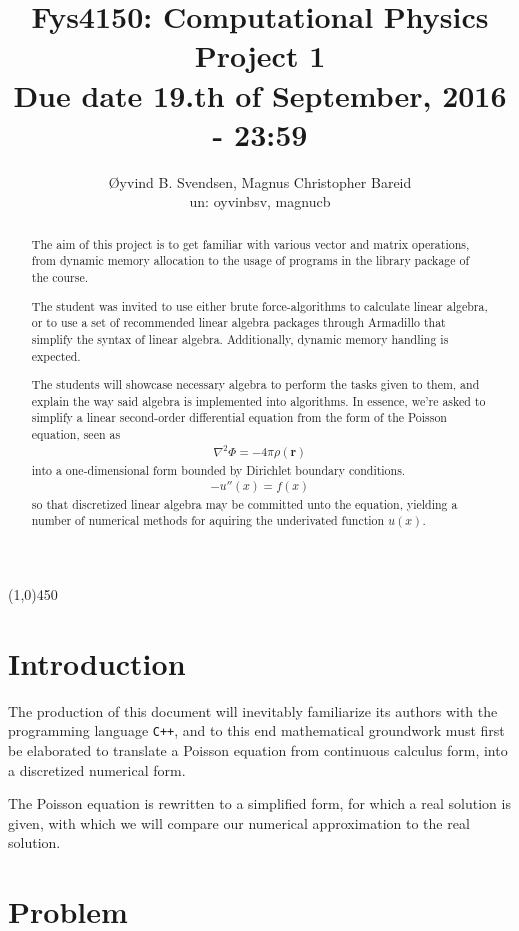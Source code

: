 \documentclass[11pt,a4paper,notitlepage]{article}
\title{\normalsize Fys4150: Computational Physics \\
\vspace{10mm}
\huge Project 1\\
\vspace{10mm}
\normalsize Due date {\bf 19.th of September, 2016 - 23:59}}
\author{Øyvind B. Svendsen, Magnus Christopher Bareid \\ un: oyvinbsv, magnucb}
\begin{document}
\noindent
\maketitle
\vspace{10mm}
\begin{abstract}
The aim of this project is to get familiar with various vector and matrix operations, from dynamic memory allocation to the usage of programs in the library package of the course.

The student was invited to use either brute force-algorithms to calculate linear algebra, or to use a set of recommended linear algebra packages through Armadillo that simplify the syntax of linear algebra. Additionally, dynamic memory handling is expected.

The students will showcase necessary algebra to perform the tasks given to them, and explain the way said algebra is implemented into algorithms. In essence, we're asked to simplify a linear second-order differential equation from the form of the Poisson equation, seen as
\begin{align*}
\nabla ^2 \Phi = -4\pi\rho(\mathbf{r})
\end{align*}
into a one-dimensional form bounded by Dirichlet boundary conditions.
\begin{align*}
-u''(x) = f(x)
\end{align*}
so that discretized linear algebra may be committed unto the equation, yielding a number of numerical methods for aquiring the underivated function $u(x)$.
\end{abstract}
\begin{center}
\line(1,0){450}
\end{center}

\tableofcontents

\newpage
\section{Introduction}
The production of this document will inevitably familiarize its authors with the programming language \verb|C++|, and to this end mathematical groundwork must first be elaborated to translate a Poisson equation from continuous calculus form, into a discretized numerical form.

The Poisson equation is rewritten to a simplified form, for which a real solution is given, with which we will compare our numerical approximation to the real solution.

\section{Problem}
\end{document}
